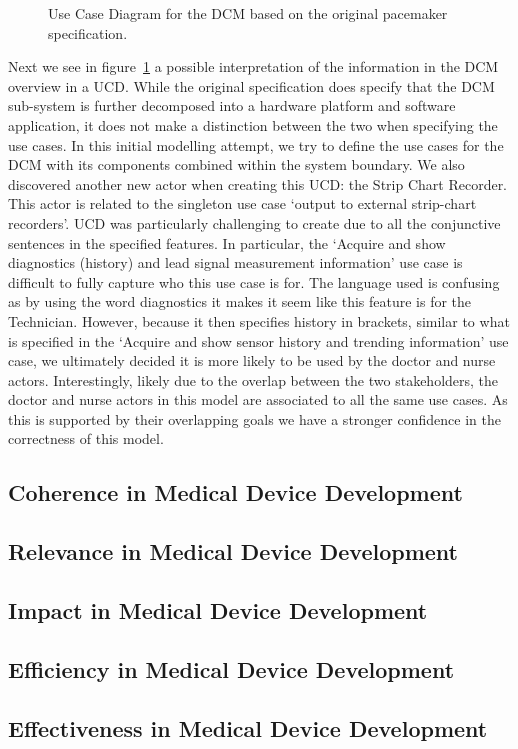 \begin{figure}
	\centering
	
	\caption{Use Case Diagram for the DCM based on the original pacemaker specification.}
	\label{fig:DCM_UCD_original_spec}
\end{figure}

Next we see in figure~\ref{fig:DCM_UCD_original_spec} a possible interpretation of the information in the DCM overview in a UCD. While the original specification does specify that the DCM sub-system is further decomposed into a hardware platform and software application, it does not make a distinction between the two when specifying the use cases. In this initial modelling attempt, we try to define the use cases for the DCM with its components combined within the system boundary. We also discovered another new actor when creating this UCD: the Strip Chart Recorder. This actor is related to the singleton use case `output to external strip-chart recorders'. UCD was particularly challenging to create due to all the conjunctive sentences in the specified features. In particular, the `Acquire and show diagnostics (history) and lead signal measurement information' use case is difficult to fully capture who this use case is for. The language used is confusing as by using the word diagnostics it makes it seem like this feature is for the Technician. However, because it then specifies history in brackets, similar to what is specified in the `Acquire and show sensor history and trending information' use case, we ultimately decided it is more likely to be used by the doctor and nurse actors. Interestingly, likely due to the overlap between the two stakeholders, the doctor and nurse actors in this model are associated to all the same use cases. As this is supported by their overlapping goals we have a stronger confidence in the correctness of this model.



\subsection{Coherence in Medical Device Development}

\subsection{Relevance in Medical Device Development}

\subsection{Impact in Medical Device Development}

\subsection{Efficiency in Medical Device Development}

\subsection{Effectiveness in Medical Device Development}